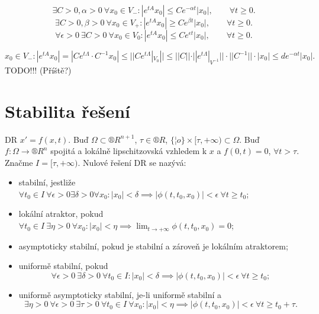 \documentclass[12pt]{article}					%
\begin{document}
\begin{veta}
	$$ \exists C > 0, \alpha > 0\ \forall x_0 \in V_-: |e^{tA} x_0| ≤ C e^{-\alpha t}|x_0|, \qquad \forall t ≥ 0. $$
	$$ \exists C > 0, \beta > 0\ \forall x_0 \in V_+: |e^{tA} x_0| ≥ C e^{\beta t}|x_0|, \qquad \forall t ≥ 0. $$
	$$ \forall \epsilon > 0\ \exists C > 0\ \forall x_0 \in V_0: |e^{tA} x_0| ≤ C e^{\epsilon t}|x_0|, \qquad \forall t ≥ 0. $$

	\begin{dukazin}
		$$ x_0 \in V_-: |e^{tA} x_0| = |C e^{t \Lambda} · C^{-1} x_0| ≤ ||C e^{t \Lambda}|_{V_0}|| ≤ ||C|| · ||e^{t \Lambda}|_{V^{-1}}||·||C^{-1}||·|x_0| ≤ d e^{-\alpha t} |x_0|. $$
		TODO!!! (Příště?)
	\end{dukazin}
\end{veta}

\section{Stabilita řešení}
\begin{definice}
	DR $x' = f(x, t)$. Buď $\Omega \subset ®R^{n+1}$, $\tau \in ®R$, $\{¦o\} \times [\tau, +∞) \subset \Omega$. Buď $f: \Omega \rightarrow ®R^n$ spojitá a lokálně lipschitzovská vzhledem k $x$ a $f(0, t) = 0$, $\forall t > \tau$. Značme $I = [\tau, +∞)$. Nulové řešení DR se nazývá:

	\begin{itemize}
		\item stabilní, jestliže $\forall t_0 \in I\ \forall \epsilon > 0 \exists \delta > 0 \forall x_0: |x_0| < \delta \implies |\phi(t, t_0, x_0)| < \epsilon\ \forall t ≥ t_0$;
		\item lokální atraktor, pokud $\forall t_0 \in I\ \exists \eta > 0\ \forall x_0: |x_0| < \eta \implies \lim_{t \rightarrow +∞} \phi(t, t_0, x_0) = 0$;
		\item asymptoticky stabilní, pokud je stabilní a zároveň je lokálním atraktorem;
%
%
		\item uniformě stabilní, pokud
			$$ \forall \epsilon > 0\ \exists \delta > 0\ \forall t_0 \in I: |x_0| < \delta \implies |\phi(t, t_0, x_0)| < \epsilon\ \forall t ≥ t_0; $$
		\item uniformě asymptoticky stabilní, je-li uniformě stabilní a
			$$ \exists \eta > 0\ \forall \epsilon > 0\ \exists \tau > 0\ \forall t_0 \in I\ \forall x_0: |x_0| < \eta \implies |\phi(t, t_0, x_0)| < \epsilon\ \forall t ≥ t_0 + \tau. $$
	\end{itemize}
\end{definice}
\end{document}
